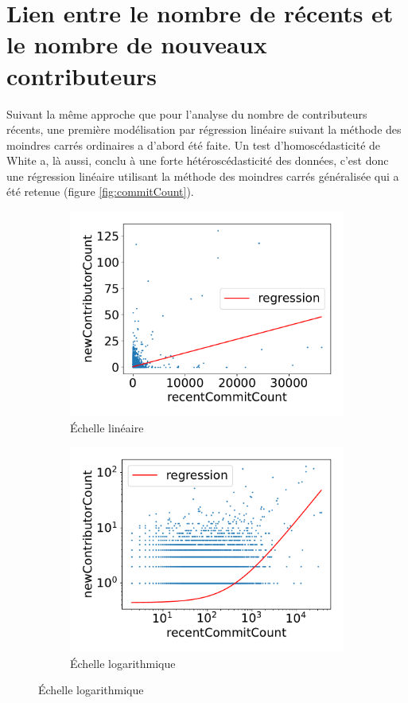 \section{Lien entre le nombre de  récents et le nombre de nouveaux contributeurs}

Suivant la même approche que pour l'analyse du nombre de contributeurs récents, une première modélisation par
régression linéaire suivant la méthode des moindres carrés ordinaires a d'abord été faite. Un test
d'homoscédasticité de White a, là aussi, conclu à une forte hétéroscédasticité des données, c'est donc une
régression linéaire utilisant la méthode des moindres carrés généralisée qui a été retenue (figure
\ref{fig:commitCount}).

\begin{figure}[ht]
    \centering
    \begin{subfigure}[t]{0.5\textwidth}
        \includegraphics[width=\textwidth]{../experiment/data_analysis/recentCommitCountRegression_linearScale}
        \caption{Échelle linéaire}
    \end{subfigure}%
    \begin{subfigure}[t]{0.5\textwidth}
        \includegraphics[width=\textwidth]{../experiment/data_analysis/recentCommitCountRegression_logScale}
        \caption{Échelle logarithmique}
    \end{subfigure}


\end{figure}
